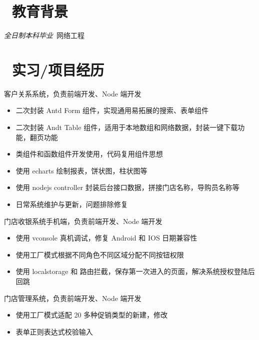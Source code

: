 \documentclass{resume}
\begin{document}


 
\section{\faGraduationCap\ 教育背景}
\textit{全日制本科毕业}\ 网络工程

\section{\faUsers\ 实习/项目经历}
客户关系系统，负责前端开发、Node 端开发
\begin{itemize}
  \item 二次封装 Antd Form 组件，实现通用易拓展的搜索、表单组件
  \item 二次封装 Andt Table 组件，适用于本地数组和网络数据，封装一键下载功能，翻页功能
  \item 类组件和函数组件开发使用，代码复用组件思想
  \item 使用 echarts 绘制报表，饼状图，柱状图等
  \item 使用 nodejs controller 封装后台接口数据，拼接门店名称，导购员名称等
  \item 日常系统维护与更新，问题排除修复
\end{itemize}

\begin{onehalfspacing}
门店收银系统手机端，负责前端开发、Node 端开发
\begin{itemize}
  \item 使用 vconsole 真机调试，修复 Android 和 IOS 日期兼容性
  \item 使用工厂模式根据不同角色不同区域分配不同按钮权限
  \item 使用 localstorage 和 路由拦截，保存第一次进入的页面，解决系统授权登陆后回跳
\end{itemize}
\end{onehalfspacing}

\begin{onehalfspacing}
门店管理系统，负责前端开发、Node 端开发
\begin{itemize}
  \item 使用工厂模式适配 20 多种促销类型的新建，修改
  \item 表单正则表达式校验输入
\end{itemize}
\end{onehalfspacing}
\end{document}
